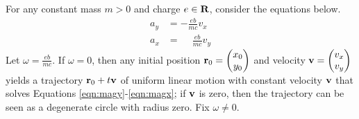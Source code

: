 \begin{answer}
	For any constant mass $m > 0$ and charge $e \in \mathbf{R}$, consider the equations below.
	\begin{align}
		a_y & = - \frac{e b}{m c} v_x \label{eqn:magy}           \\
		a_x & = \phantom{+} \frac{e b}{m c} v_y \label{eqn:magx}
	\end{align}
	Let $\omega = \frac{e b}{m c}$.
	If $\omega = 0$, then any initial position $\mathbf{r}_0 = \begin{pmatrix} x_0 \\ y_0 \end{pmatrix}$ and velocity $\mathbf{v} = \begin{pmatrix} v_x \\ v_y \end{pmatrix}$ yields a trajectory $\mathbf{r}_0 + t \mathbf{v}$ of uniform linear motion with constant velocity $\mathbf{v}$ that solves Equations \eqref{eqn:magy}-\eqref{eqn:magx}; if $\mathbf{v}$ is zero, then the trajectory can be seen as a degenerate circle with radius zero.
	Fix $\omega \neq 0$.


\end{answer}

